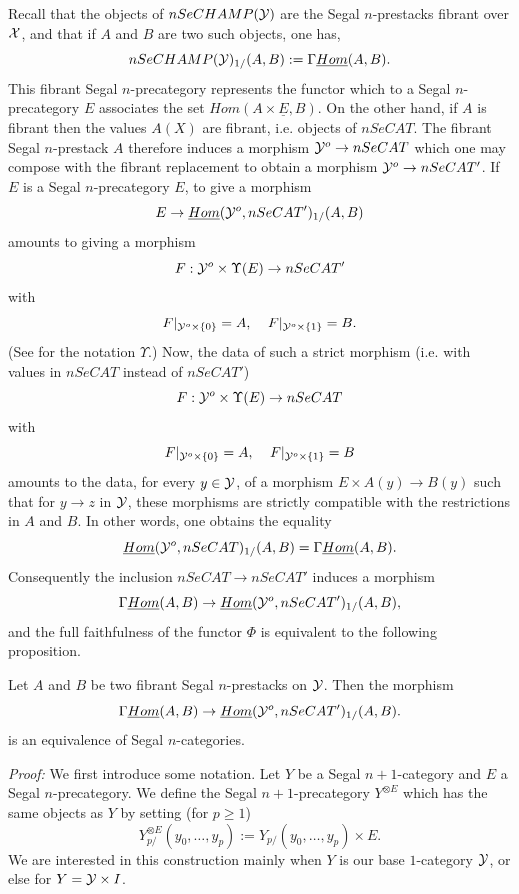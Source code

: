 Recall that the objects of $nSeCHAMP({\cal Y} )$ are the Segal $n$-prestacks
fibrant over ${\cal X}$, and that if $A$ and $B$ are two such objects, one has,
$$
nSeCHAMP ({\cal Y} )_{1/}(A,B) := \Gamma \underline{Hom}(A,B).
$$
This fibrant Segal $n$-precategory represents the functor which to a
Segal $n$-precategory $E$ associates the set $Hom (A\times \underline{E}, B)$.
On the other hand, if $A$ is fibrant then the values $A(X)$ are fibrant, i.e.
objects of
$nSeCAT$. The fibrant Segal $n$-prestack $A$ therefore induces a morphism
${\cal Y} ^o \rightarrow  nSeCAT$ which one may compose with the fibrant
replacement
to obtain a morphism ${\cal Y} ^o \rightarrow  nSeCAT'$.
If $E$ is a Segal $n$-precategory $E$, to give a
morphism
$$
E\rightarrow \underline{Hom}({\cal Y} ^o, nSeCAT')_{1/}(A,B)
$$
amounts to giving a morphism
$$
F:{\cal Y} ^o\times \Upsilon (E) \rightarrow nSeCAT'
$$
with
$$
F|_{{\cal Y} ^o \times \{ 0\}} = A,\;\;\;\;
F|_{{\cal Y} ^o \times \{ 1\} } = B.
$$
(See \cite{limits} for the notation $\Upsilon$.)
Now, the
data of such a
strict morphism (i.e. with values in $nSeCAT$ instead of $nSeCAT'$)
$$
F: {\cal Y} ^o\times \Upsilon (E) \rightarrow nSeCAT
$$
with
$$
F|_{{\cal Y} ^o \times \{ 0\}} = A,\;\;\;\;
F|_{{\cal Y} ^o \times \{ 1\}} = B
$$
amounts to the data, for every $y\in {\cal Y}$, of a morphism
$E\times A(y)\rightarrow B(y)$ such that for $y\rightarrow z$ in ${\cal Y}$, these
morphisms are strictly compatible with the restrictions in $A$ and $B$.
In other words, one obtains the equality
$$
\underline{Hom}({\cal Y} ^o, nSeCAT)_{1/}(A,B) = \Gamma \underline{Hom}(A,B).
$$
Consequently the inclusion $nSeCAT \rightarrow nSeCAT'$ induces a morphism
$$
\Gamma \underline{Hom}(A,B) \rightarrow
\underline{Hom}({\cal Y} ^o, nSeCAT')_{1/}(A,B),
$$
and the full faithfulness of the functor
$\Phi$ is equivalent to the following proposition.

\begin{proposition}
\label{pleinfidele}
Let $A$ and $B$ be two fibrant Segal $n$-prestacks on ${\cal Y}$. Then the
morphism
$$
\Gamma \underline{Hom}(A,B) \rightarrow
\underline{Hom}({\cal Y} ^o, nSeCAT')_{1/}(A,B).
$$
is an equivalence of Segal $n$-categories.
\end{proposition}
{\em Proof:} We first introduce some notation.
Let $Y$ be a Segal $n+1$-category and $E$ a Segal $n$-precategory. We
define the Segal $n+1$-precategory $Y^{\otimes E}$ which has the same objects
as $Y$ by setting (for $p\geq 1$)
$$
Y^{\otimes E}_{p/}(y_0,\ldots , y_p):=
Y_{p/}(y_0,\ldots , y_p) \times E.
$$
We are interested in this construction mainly when $Y$ is
our base $1$-category ${\cal Y}$, or else for $Y={\cal Y} \times I$.


